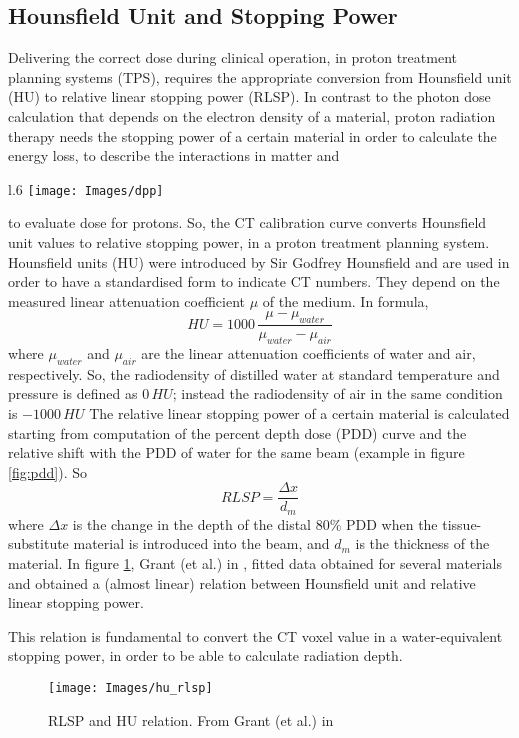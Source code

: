 \documentclass[12pt, a4paper, twoside]{book}
\begin{document}
\subsection{Hounsfield Unit and Stopping Power}
Delivering the correct dose during clinical operation, in proton treatment planning systems (TPS), requires the appropriate conversion from Hounsfield unit (HU) to relative linear stopping power (RLSP). In contrast to the photon dose calculation that depends on the electron density of a material, proton radiation therapy  needs the stopping power of a certain material in order to calculate the energy loss, to describe the interactions in matter and
\begin{wrapfigure}{l}{.6\textwidth}
{\texttt{[image: Images/dpp]}}
\caption{PDD example of a beam in water with and without a slab of Nylon on the surface. Grant (et al.) \cite{gra:hu}}
\label{fig:pdd}
\end{wrapfigure}
\noindent to evaluate dose for protons. So, the CT calibration curve converts Hounsfield unit values to relative stopping power, in a proton treatment planning system.
Hounsfield units (HU) were introduced by Sir Godfrey Hounsfield and are used in order to have a standardised form to indicate CT numbers.
They depend on the measured linear attenuation coefficient $\mu$ of the medium.
In formula,
\[
HU=1000\,\frac {\mu -\mu _{water}}{\mu _{water}-\mu _{air}}
\]
where $\mu _{water}$ and $\mu _{air}$ are the linear attenuation coefficients of water and air, respectively.
So, the radiodensity of distilled water at standard temperature and pressure is defined as $0\,HU$; instead the radiodensity of air in the same condition is $-1000\,HU$
The relative linear stopping power of a certain material is calculated starting from computation of the percent depth dose (PDD) curve and the relative shift with the PDD of water for the same beam (example in figure \ref{fig:pdd}).
So
\[
RLSP = \frac{\Delta x}{d_m}
\]
where $\Delta x$ is the change in the depth of the distal $80\%$ PDD when the tissue-substitute material is introduced into the beam, and $d_m$ is the thickness of the material.
In figure \ref{fig:HU}, Grant (et al.) in \cite{gra:hu}, fitted data obtained for several materials and obtained a (almost linear) relation between Hounsfield unit and relative linear stopping power.

This relation is fundamental to convert the CT voxel value in a water-equivalent stopping power, in order to be able to calculate radiation depth.
\begin{figure}[t]
\centering
{\texttt{[image: Images/hu\_rlsp]}}
\caption{RLSP and HU relation. From Grant (et al.) in \cite{gra:hu}}
\label{fig:HU}
\end{figure}
\end{document}

